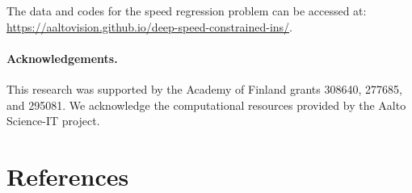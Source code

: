 \documentclass{article}
\begin{document}
The data and codes for the speed regression problem can be accessed at: \url{https://aaltovision.github.io/deep-speed-constrained-ins/}.

\paragraph*{Acknowledgements.} 
This research was supported by the Academy of Finland grants 308640, 277685, and 295081. We acknowledge the computational resources provided by the Aalto Science-IT project.



\section{References}
\balance
\begingroup
\renewcommand{\section}[1]{}
\small



\endgroup
\end{document}
